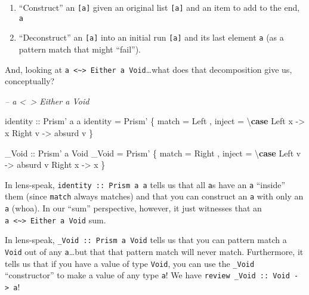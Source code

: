 \documentclass[]{article}
\newenvironment{Shaded}{}{}
\newcommand{\CommentTok}[1]{\textcolor[rgb]{0.38,0.63,0.69}{\textit{#1}}}
\newcommand{\DataTypeTok}[1]{\textcolor[rgb]{0.56,0.13,0.00}{#1}}
\newcommand{\FunctionTok}[1]{\textcolor[rgb]{0.02,0.16,0.49}{#1}}
\newcommand{\KeywordTok}[1]{\textcolor[rgb]{0.00,0.44,0.13}{\textbf{#1}}}
\newcommand{\NormalTok}[1]{#1}
\newcommand{\OtherTok}[1]{\textcolor[rgb]{0.00,0.44,0.13}{#1}}
\begin{document}
\begin{enumerate}
\def\labelenumi{\arabic{enumi}.}
\tightlist
\item
  ``Construct'' an \texttt{{[}a{]}} given an original list \texttt{{[}a{]}} and
  an item to add to the end, \texttt{a}
\item
  ``Deconstruct'' an \texttt{{[}a{]}} into an initial run \texttt{{[}a{]}} and
  its last element \texttt{a} (as a pattern match that might ``fail'').
\end{enumerate}

And, looking at
\texttt{a\ \textless{}\textasciitilde{}\textgreater{}\ Either\ a\ Void}\ldots{}what
does that decomposition give us, conceptually?

\begin{Shaded}
\begin{Highlighting}[]
\CommentTok{-- a <~> Either a Void}

\OtherTok{identity ::} \DataTypeTok{Prism'}\NormalTok{ a a}
\NormalTok{identity }\FunctionTok{=} \DataTypeTok{Prism'}\NormalTok{ \{ match }\FunctionTok{=} \DataTypeTok{Left}
\NormalTok{                  , inject }\FunctionTok{=}\NormalTok{ \textbackslash{}}\KeywordTok{case}
                      \DataTypeTok{Left}\NormalTok{  x }\OtherTok{->}\NormalTok{ x}
                      \DataTypeTok{Right}\NormalTok{ v }\OtherTok{->}\NormalTok{ absurd v}
\NormalTok{                  \}}


\OtherTok{_Void ::} \DataTypeTok{Prism'}\NormalTok{ a }\DataTypeTok{Void}
\NormalTok{_Void }\FunctionTok{=} \DataTypeTok{Prism'}\NormalTok{ \{ match }\FunctionTok{=} \DataTypeTok{Right}
\NormalTok{               , inject }\FunctionTok{=}\NormalTok{ \textbackslash{}}\KeywordTok{case}
                   \DataTypeTok{Left}\NormalTok{  v }\OtherTok{->}\NormalTok{ absurd v}
                   \DataTypeTok{Right}\NormalTok{ x }\OtherTok{->}\NormalTok{ x}
\NormalTok{               \}}
\end{Highlighting}
\end{Shaded}

In lens-speak, \texttt{identity\ ::\ Prism\textquotesingle{}\ a\ a} tells us
that all \texttt{a}s have an \texttt{a} ``inside'' them (since \texttt{match}
always matches) and that you can construct an \texttt{a} with only an \texttt{a}
(whoa). In our ``sum'' perspective, however, it just witnesses that an
\texttt{a\ \textless{}\textasciitilde{}\textgreater{}\ Either\ a\ Void} sum.

In lens-speak, \texttt{\_Void\ ::\ Prism\textquotesingle{}\ a\ Void} tells us
that you can pattern match a \texttt{Void} out of any \texttt{a}\ldots{}but that
that pattern match will never match. Furthermore, it tells us that if you have a
value of type \texttt{Void}, you can use the \texttt{\_Void} ``constructor'' to
make a value of any type \texttt{a}! We have
\texttt{review\ \_Void\ ::\ Void\ -\textgreater{}\ a}!
\end{document}
